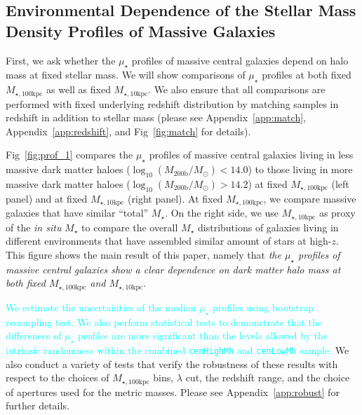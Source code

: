 \documentclass[a4paper,fleqn,usenatbib]{mnras}
\def\rbcg{\texttt{cenHighMh}}
\def\nbcg{\texttt{cenLowMh}}
\def\mstar{{$M_{\star}$}}
\def\logmh{{$\log_{10} (M_{\mathrm{200b}}/M_{\odot})$}}
\def\minn{{$M_{\star,10\mathrm{kpc}}$}}
\def\mtot{{$M_{\star,100\mathrm{kpc}}$}}
\def\mden{{$\mu_{\star}$}}
\newcommand{\song}[1]{\textcolor{cyan}{#1}}
\begin{document}
\subsection{Environmental Dependence of the Stellar Mass Density Profiles of Massive 
            Galaxies}
    \label{ssec:sbp_mtot} 
       
    First, we ask whether the \mden{} profiles of massive central galaxies depend on 
    halo mass at fixed stellar mass.    
    We will show comparisons of \mden{} profiles at both fixed \mtot{} as well as fixed 
    \minn{}. 
    We also ensure that all comparisons are performed with fixed underlying redshift
    distribution by matching samples in redshift in addition to stellar mass
    (please see Appendix~\ref{app:match}, Appendix~\ref{app:redshift}, 
    and Fig~\ref{fig:match} for details). 
   
    Fig~\ref{fig:prof_1} compares the \mden{} profiles of massive central galaxies 
    living in less massive dark matter haloes (\logmh$<14.0$) to those living in more 
    massive dark matter haloes (\logmh$>14.2$) at fixed \mtot{} (left panel) and at 
    fixed \minn{} (right panel). 
    At fixed \mtot{}, we compare massive galaxies that have similar ``total'' \mstar{}. 
    On the right side, we use \minn{} as proxy of the \textit{in situ} \mstar{} to 
    compare the overall \mstar{} distributions of galaxies living in different 
    environments that have assembled similar amount of stars at high-$z$.
    This figure shows the main result of this paper, namely that 
    \emph{the \mden{} profiles of massive central galaxies show a clear dependence on 
    dark matter halo mass at both fixed \mtot{} and \minn{}.}

    \song{
    We estimate the uncertainties of the median \mden{} profiles using bootstrap 
    resampling test. 
    We also perform statistical tests to demonstrate that the differences of \mden{}
    profiles are more significant than the levels allowed by the intrinsic randomness
    within the combined \rbcg{} and \nbcg{} sample. 
    }
    We also conduct a variety of tests that verify the robustness of these results with
    respect to the choices of \mtot{} bins, $\lambda$ cut, the redshift range, and the 
    choice of apertures used for the metric masses. 
    Please see Appendix~\ref{app:robust} for further details.
   
\end{document}

